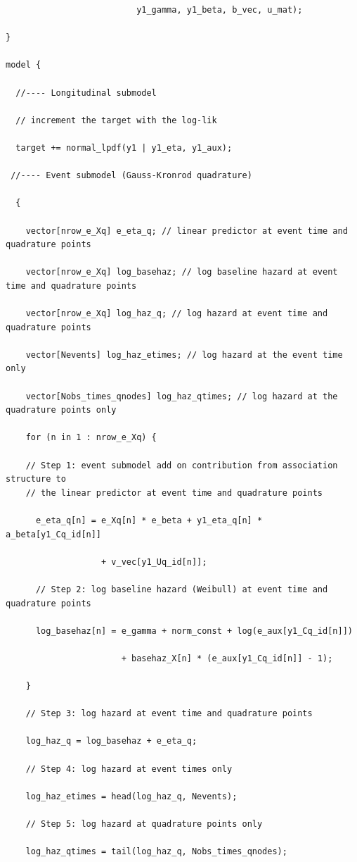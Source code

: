 \begin{SingleSpace}
\begin{verbatim}
                          y1_gamma, y1_beta, b_vec, u_mat);

}

model {

  //---- Longitudinal submodel

  // increment the target with the log-lik

  target += normal_lpdf(y1 | y1_eta, y1_aux);

 //---- Event submodel (Gauss-Kronrod quadrature)

  {

    vector[nrow_e_Xq] e_eta_q; // linear predictor at event time and quadrature points

    vector[nrow_e_Xq] log_basehaz; // log baseline hazard at event time and quadrature points

    vector[nrow_e_Xq] log_haz_q; // log hazard at event time and quadrature points

    vector[Nevents] log_haz_etimes; // log hazard at the event time only

    vector[Nobs_times_qnodes] log_haz_qtimes; // log hazard at the quadrature points only

    for (n in 1 : nrow_e_Xq) {
      
    // Step 1: event submodel add on contribution from association structure to
    // the linear predictor at event time and quadrature points
    
      e_eta_q[n] = e_Xq[n] * e_beta + y1_eta_q[n] * a_beta[y1_Cq_id[n]]

                   + v_vec[y1_Uq_id[n]];

      // Step 2: log baseline hazard (Weibull) at event time and quadrature points

      log_basehaz[n] = e_gamma + norm_const + log(e_aux[y1_Cq_id[n]])

                       + basehaz_X[n] * (e_aux[y1_Cq_id[n]] - 1);

    }

    // Step 3: log hazard at event time and quadrature points

    log_haz_q = log_basehaz + e_eta_q;

    // Step 4: log hazard at event times only

    log_haz_etimes = head(log_haz_q, Nevents);
    
    // Step 5: log hazard at quadrature points only

    log_haz_qtimes = tail(log_haz_q, Nobs_times_qnodes);


\end{verbatim}
\end{SingleSpace}
